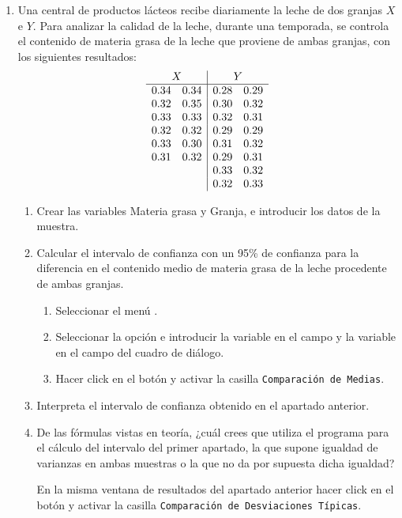 \documentclass[a4paper]{article}
\begin{document}
\begin{enumerate}[leftmargin=*]
\item  Una central de productos lácteos recibe diariamente la leche de dos granjas $X$ e $Y$. Para analizar la
calidad de la leche, durante una temporada, se controla el contenido de materia grasa de la leche que proviene de ambas granjas, con los siguientes resultados:
\[
\begin{array}{ll|ll}
\multicolumn{2}{c|}{X} & \multicolumn{2}{c}{Y} \\
\hline
0.34 & 0.34 & 0.28 & 0.29 \\
0.32 & 0.35 & 0.30 & 0.32 \\
0.33 & 0.33 & 0.32 & 0.31 \\
0.32 & 0.32 & 0.29 & 0.29 \\
0.33 & 0.30 & 0.31 & 0.32 \\
0.31 & 0.32 & 0.29 & 0.31 \\
 &  & 0.33 & 0.32 \\
 &  & 0.32 & 0.33 \\
\end{array}
\]

\begin{enumerate}

\item Crear las variables \textsf{Materia grasa} y \textsf{Granja}, e introducir los datos de la muestra.

\item Calcular el intervalo de confianza con un 95\% de confianza para la diferencia en el contenido medio de materia grasa de la leche procedente de ambas granjas.
\begin{indicacion}{
\begin{enumerate}
\item Seleccionar el menú .
\item Seleccionar la opción  e introducir la variable  en el campo  y la variable  en el campo  del cuadro de diálogo.
\item Hacer click en el botón  y activar la casilla \texttt{Comparación de Medias}.
\end{enumerate}}
\end{indicacion}

\item Interpreta el intervalo de confianza obtenido en el apartado anterior.

\item De las fórmulas vistas en teoría, ¿cuál crees que utiliza el programa para el cálculo del intervalo del primer apartado, la que supone igualdad de varianzas en ambas muestras o la que no da por supuesta dicha igualdad?
\begin{indicacion}{
En la misma ventana de resultados del apartado anterior hacer click en el botón  y activar la casilla \texttt{Comparación de Desviaciones Típicas}.}
\end{indicacion}


\end{enumerate}
\end{enumerate}
\end{document}
